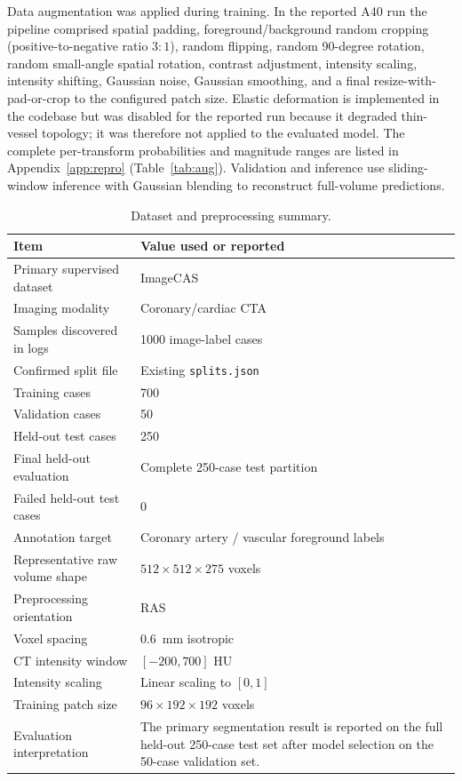 \documentclass[anonymous]{iopjournal}
\begin{document}
Data augmentation was applied during training. In the reported A40 run the pipeline comprised spatial padding, foreground/background random cropping (positive-to-negative ratio $3{:}1$), random flipping, random 90-degree rotation, random small-angle spatial rotation, contrast adjustment, intensity scaling, intensity shifting, Gaussian noise, Gaussian smoothing, and a final resize-with-pad-or-crop to the configured patch size. Elastic deformation is implemented in the codebase but was disabled for the reported run because it degraded thin-vessel topology; it was therefore not applied to the evaluated model. The complete per-transform probabilities and magnitude ranges are listed in Appendix~\ref{app:repro} (Table~\ref{tab:aug}). Validation and inference use sliding-window inference with Gaussian blending to reconstruct full-volume predictions.

\begin{table}[!t]
\centering
\caption{Dataset and preprocessing summary.}
\label{tab:dataset}
\begin{threeparttable}
\footnotesize
\begin{tabularx}{0.92\textwidth}{L{0.38\textwidth}Y}
\toprule
\textbf{Item} & \textbf{Value used or reported} \\
\midrule
Primary supervised dataset & ImageCAS \\
Imaging modality & Coronary/cardiac CTA \\
Samples discovered in logs & 1000 image-label cases \\
Confirmed split file & Existing \texttt{splits.json} \\
Training cases & 700 \\
Validation cases & 50 \\
Held-out test cases & 250 \\
Final held-out evaluation & Complete 250-case test partition \\
Failed held-out test cases & 0 \\
Annotation target & Coronary artery / vascular foreground labels \\
Representative raw volume shape & $512\times512\times275$ voxels \\
Preprocessing orientation & RAS \\
Voxel spacing & \SI{0.6}{mm} isotropic \\
CT intensity window & $[-200,700]$ HU \\
Intensity scaling & Linear scaling to $[0,1]$ \\
Training patch size & $96\times192\times192$ voxels \\
Evaluation interpretation & The primary segmentation result is reported on the full held-out 250-case test set after model selection on the 50-case validation set. \\
\bottomrule
\end{tabularx}
\end{threeparttable}
\end{table}
\end{document}
